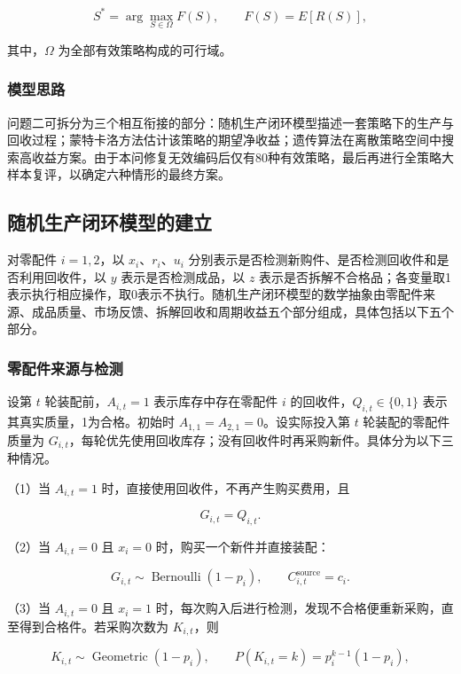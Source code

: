 \documentclass{cumcm}
\numberwithin{figure}{section}
\numberwithin{table}{section}
\begin{document}
\[
S^*=\arg\max_{S\in\Omega}F(S),
\qquad
F(S)=E[R(S)],
\]

其中，\(\Omega\) 为全部有效策略构成的可行域。

\subsubsection{模型思路}\label{ux6a21ux578bux601dux8def}

问题二可拆分为三个相互衔接的部分：随机生产闭环模型描述一套策略下的生产与回收过程；蒙特卡洛方法估计该策略的期望净收益；遗传算法在离散策略空间中搜索高收益方案。由于本问修复无效编码后仅有80种有效策略，最后再进行全策略大样本复评，以确定六种情形的最终方案。

\subsection{随机生产闭环模型的建立}\label{ux968fux673aux751fux4ea7ux95edux73afux6a21ux578bux7684ux5efaux7acb}

对零配件 \(i=1,2\)，以 \(x_i\)、\(r_i\)、\(u_i\) 分别表示是否检测新购件、是否检测回收件和是否利用回收件，以 \(y\) 表示是否检测成品，以 \(z\) 表示是否拆解不合格品；各变量取1表示执行相应操作，取0表示不执行。随机生产闭环模型的数学抽象由零配件来源、成品质量、市场反馈、拆解回收和周期收益五个部分组成，具体包括以下五个部分。

\subsubsection{零配件来源与检测}\label{ux96f6ux914dux4ef6ux6765ux6e90ux4e0eux68c0ux6d4b}

设第 \(t\) 轮装配前，\(A_{i,t}=1\) 表示库存中存在零配件 \(i\) 的回收件，\(Q_{i,t}\in\{0,1\}\) 表示其真实质量，1为合格。初始时 \(A_{1,1}=A_{2,1}=0\)。设实际投入第 \(t\) 轮装配的零配件质量为 \(G_{i,t}\)，每轮优先使用回收库存；没有回收件时再采购新件。具体分为以下三种情况。

（1）当 \(A_{i,t}=1\) 时，直接使用回收件，不再产生购买费用，且

\[
G_{i,t}=Q_{i,t}.
\]

（2）当 \(A_{i,t}=0\) 且 \(x_i=0\) 时，购买一个新件并直接装配：

\[
G_{i,t}\sim\operatorname{Bernoulli}(1-p_i),
\qquad
C_{i,t}^{\mathrm{source}}=c_i.
\]

（3）当 \(A_{i,t}=0\) 且 \(x_i=1\) 时，每次购入后进行检测，发现不合格便重新采购，直至得到合格件。若采购次数为 \(K_{i,t}\)，则

\[
K_{i,t}\sim\operatorname{Geometric}(1-p_i),
\qquad
P(K_{i,t}=k)=p_i^{k-1}(1-p_i),
\]
\end{document}
